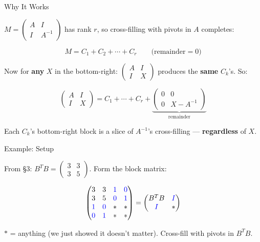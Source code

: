 \documentclass[10pt]{beamer}
\theoremstyle{definition}
\newcommand{\x}[1]{\alert{\textbf{#1}}}
\newcommand{\bl}[1]{{\color{blue}#1}}                 %
\begin{document}
\begin{frame}{Why It Works}

$M = \begin{pmatrix} A & I \\ I & A^{-1} \end{pmatrix}$ has rank $r$, so cross-filling with pivots in $A$ completes:

$$M = C_1 + C_2 + \cdots + C_r \qquad \text{(remainder} = 0\text{)}$$

\vspace{0.3em}

Now for \x{any} $X$ in the bottom-right: $\begin{pmatrix} A & I \\ I & X \end{pmatrix}$ produces the \x{same} $C_k$'s. So:

$$\begin{pmatrix} A & I \\ I & X \end{pmatrix} = C_1 + \cdots + C_r + \underbrace{\begin{pmatrix} 0 & 0 \\ 0 & X - A^{-1} \end{pmatrix}}_{\text{remainder}}$$

Each $C_k$'s bottom-right block is a slice of $A^{-1}$'s cross-filling — \x{regardless} of $X$.

\end{frame}


\begin{frame}{Example: Setup}

From \S3: $B^TB = \begin{pmatrix} 3 & 3 \\ 3 & 5 \end{pmatrix}$. Form the block matrix:

$$\begin{pmatrix} 3 & 3 & \bl{1} & \bl{0} \\ 3 & 5 & \bl{0} & \bl{1} \\ \bl{1} & \bl{0} & * & * \\ \bl{0} & \bl{1} & * & * \end{pmatrix} = \begin{pmatrix} B^TB & \bl{I} \\ \bl{I} & * \end{pmatrix}$$

\vspace{0.3em}

$*$ = anything (we just showed it doesn't matter). Cross-fill with pivots in $B^TB$.

\end{frame}
\end{document}
